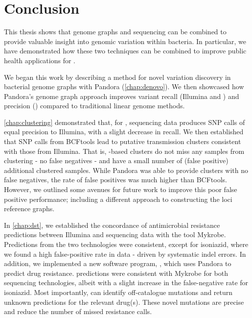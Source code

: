 \chapter*{Conclusion}
 
\label{chap:conclusion}

This thesis shows that genome graphs and \ont{} sequencing can be combined to provide valuable insight into genomic variation within bacteria. In particular, we have demonstrated how these two techniques can be combined to improve public health applications for \mtb{}.

We began this work by describing a method for novel variation discovery in bacterial genome graphs with Pandora (\autoref{chap:denovo}). We then showcased how Pandora's genome graph approach improves variant recall (Illumina and \ont{}) and precision (\ont{}) compared to traditional linear genome methods.

\autoref{chap:clustering} demonstrated that, for \mtb{}, \ont{} sequencing data produces SNP calls of equal precision to Illumina, with a slight decrease in recall. We then established that \ont{} SNP calls from BCFtools lead to putative transmission clusters consistent with those from Illumina. That is, \ont{}-based clusters do not miss any samples from clustering - no false negatives - and have a small number of (false positive) additional clustered samples. While Pandora was able to provide clusters with no false negatives, the rate of false positives was much higher than BCFtools. However, we outlined some avenues for future work to improve this poor false positive performance; including a different approach to constructing the loci reference graphs. 

In \autoref{chap:dst}, we established the concordance of antimicrobial resistance predictions between Illumina and \ont{} sequencing data with the tool Mykrobe. Predictions from the two technologies were consistent, except for isoniazid, where we found a high false-positive rate in \ont{} data - driven by systematic indel errors. In addition, we implemented a new software program, \drprg{}, which uses Pandora to predict drug resistance. \drprg{} predictions were consistent with Mykrobe for both sequencing technologies, albeit with a slight increase in the false-negative rate for isoniazid. Most importantly, \drprg{} can identify off-catalogue mutations and return unknown predictions for the relevant drug(s). These novel mutations are precise and reduce the number of missed resistance calls.

